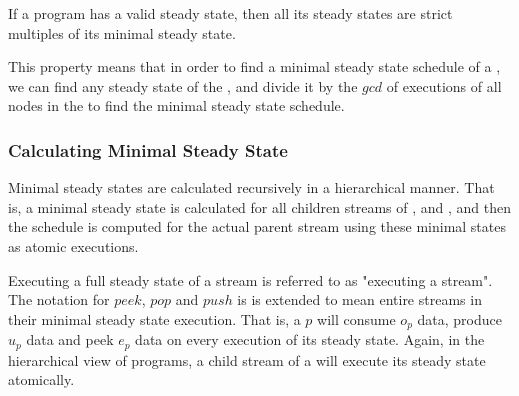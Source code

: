 \begin{theorem}
If a {\StreamIt} program has a valid steady state, then all its
steady states are strict multiples of its minimal steady state.
\label{thm:multiplicity}
\end{theorem}

\begin{comment}
\begin{proof}[Multiplicity of Minimal Steady State]
Assume that there exists a steady state that is not a multiple of
the minimal steady state.  Let $m$ denote the minimal steady
state. Let $q$ denote the other steady state.  Note that $w = q -
m$ is still a steady state, as long as all elements of $w$ remain
non-negative (by Corollary \ref{corollary:composition}).  Repeat
subtracting $m$ from $q$ until no more subtractions can be
performed without generating at least one negative element in
vector $w$.  Since $q$ is not a multiple of $m$, $w \ne 0$. But
since we cannot subtract $m$ from $w$ any further, $\exists i, m_i
> w_i$.  Since $m$ is a minimal steady state and $w$ is a steady
state, this is impossible due to Corollary
\ref{corollary:minimal-state}. Thus there are no steady states
that are not multiples of the minimal steady schedule.
\end{proof}
\end{comment}

This property means that in order to find a minimal steady state
schedule of a \stream, we can find any steady state of the
\stream, and divide it by the $gcd$ of executions of all nodes in
the \stream to find the minimal steady state schedule.

\subsubsection{Calculating Minimal Steady State}
\label{sec:calc-min-steady}

Minimal steady states are calculated recursively in a hierarchical
manner. That is, a minimal steady state is calculated for all
children streams of {\pipeline}, {\splitjoin} and {\feedbackloop},
and then the schedule is computed for the actual parent stream
using these minimal states as atomic executions.
\begin{comment}
This yields a minimal steady state
because all child streams must execute their steady states (to
avoid buffering changes), and all steady states are multiples of
the minimal steady states (per Theorem \ref{thm:multiplicity}).
\end{comment}
Executing a full steady state of a stream is referred to as
"executing a stream". The notation for $peek$, $pop$ and $push$ is
is extended to mean entire streams in their minimal steady state
execution.  That is, a {\pipeline} $p$ will consume $o_p$ data,
produce $u_p$ data and peek $e_p$ data on every execution of its
steady state.  Again, in the hierarchical view of {\StreamIt}
programs, a child stream of a {\pipeline} will execute its steady
state atomically.

